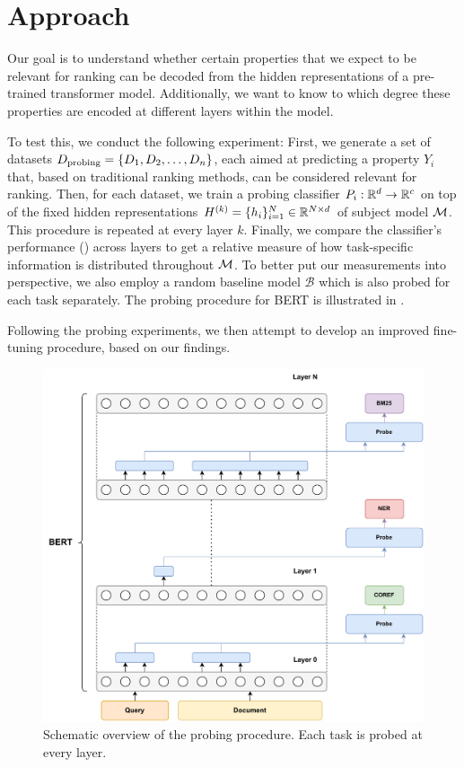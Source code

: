\chapter{Approach}
\label{chap:approach}
Our goal is to understand whether certain properties that we expect to be relevant for ranking can be decoded from the hidden representations of a pre-trained transformer model. Additionally, we want to know to which degree these properties are encoded at different layers within the model.

To test this, we conduct the following experiment: First, we generate a set of datasets $D_{\text{probing}}=\{D_1, D_2, \dots, D_n \}$, each aimed at predicting a property $Y_i$ that, based on traditional ranking methods, can be considered relevant for ranking. Then, for each dataset, we train a probing classifier $P_i: \mathbb{R}^d \rightarrow \mathbb{R}^c$ on top of the fixed hidden representations $H^{(k)} = \{h_i\}_{i=1}^N \in \mathbb{R}^{N \times d}$ of subject model $\mathcal{M}$. This procedure is repeated at every layer $k$. Finally, we compare the classifier's performance () across layers to get a relative measure of how task-specific information is distributed throughout $\mathcal{M}$. To better put our measurements into perspective, we also employ a random baseline model $\mathcal{B}$ which is also probed for each task separately. The probing procedure for BERT is illustrated in .

Following the probing experiments, we then attempt to develop an improved fine-tuning procedure, based on our findings.

\begin{figure}[!ht]
    \centering
    \includegraphics[width=\textwidth]{gfx/probing/probing}
    \caption{Schematic overview of the probing procedure. Each task is probed at every layer.}
    \label{fig:probing}
\end{figure}

